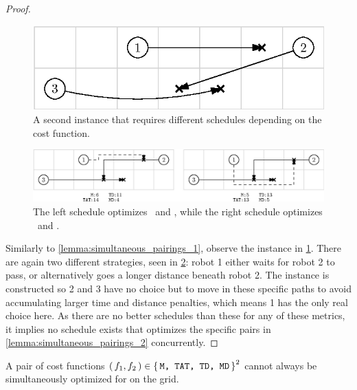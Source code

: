 \begin{proof}
	\begin{figure}[h]
		\centering
		\includegraphics[width=0.45\linewidth]{ipe/sim2_problem.eps}
		\caption{
			A second instance that requires different schedules depending on the cost function.
		}
		\label{fig:simultaneous_problem_2}
	\end{figure}

	\begin{figure}[h]
		\centering
		\includegraphics[width=\linewidth]{ipe/sim2_strat.eps}
		\caption{
			The left schedule optimizes \ and , while the right schedule optimizes \ and .
		}
		\label{fig:simultaneous_strategies_2}
	\end{figure}

	Similarly to \cref{lemma:simultaneous_pairings_1}, observe the instance in \cref{fig:simultaneous_problem_2}. 
	There are again two different strategies, seen in \cref{fig:simultaneous_strategies_2}: robot 1 either waits for robot 2 to pass, or alternatively goes a longer distance beneath robot 2.
	The instance is constructed so 2 and 3 have no choice but to move in these specific paths to avoid accumulating larger time and distance penalties, which means 1 has the only real choice here.
	As there are no better schedules than these for any of these metrics, it implies no schedule exists that optimizes the specific pairs in \cref{lemma:simultaneous_pairings_2} concurrently.
\end{proof}

\begin{theorem}
	A pair of cost functions \((\, f_1, f_2 \,) \in \set{\texttt{M, TAT, TD, MD}}^2 \) cannot always be simultaneously optimized for on the grid.
\end{theorem}

